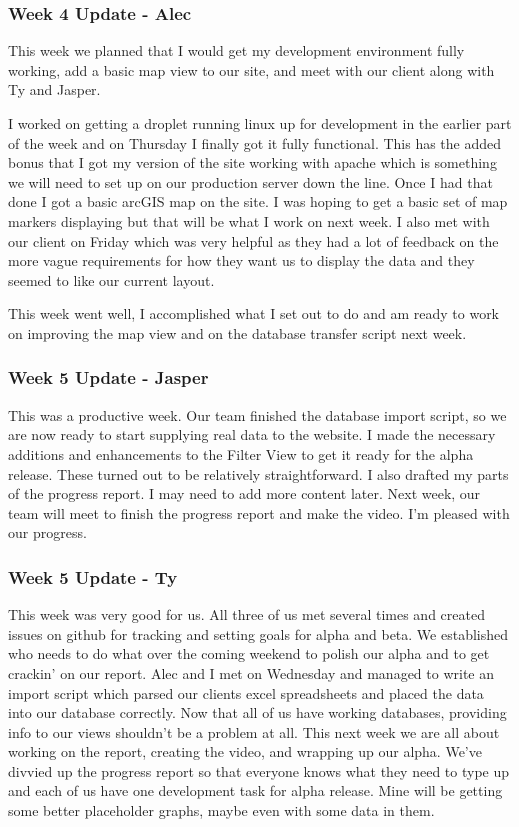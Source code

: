 \subsubsection{Week 4 Update - Alec}
​This week we planned that I would get my development environment fully working, add a basic map view to our site, and meet with our client along with Ty and Jasper.

I worked on getting a droplet running linux up for development in the earlier part of the week and on Thursday I finally got it fully functional.
This has the added bonus that I got my version of the site working with apache which is something we will need to set up on our production server down the line.
Once I had that done I got a basic arcGIS map on the site.
I was hoping to get a basic set of map markers displaying but that will be what I work on next week.
I also met with our client on Friday which was very helpful as they had a lot of feedback on the more vague requirements for how they want us to display the data and they seemed to like our current layout.

​This week went well, I accomplished what I set out to do and am ready to work on improving the map view and on the database transfer script next week.


\subsubsection{Week 5 Update - Jasper}
This was a productive week.
Our team finished the database import script, so we are now ready to start supplying real data to the website.
I made the necessary additions and enhancements to the Filter View to get it ready for the alpha release.
These turned out to be relatively straightforward.
I also drafted my parts of the progress report.
I may need to add more content later.
Next week, our team will meet to finish the progress report and make the video.​ I'm pleased with our progress.

\subsubsection{Week 5 Update - Ty}
This week was very good for us.
All three of us met several times and created issues on github for tracking and setting goals for alpha and beta.
We established who needs to do what over the coming weekend to polish our alpha and to get crackin' on our report.
Alec and I met on Wednesday and managed to write an import script which parsed our clients excel spreadsheets and placed the data into our database correctly.
Now that all of us have working databases, providing info to our views shouldn't be a problem at all.
This next week we are all about working on the report, creating the video, and wrapping up our alpha.
We've divvied up the progress report so that everyone knows what they need to type up and each of us have one development task for alpha release.
Mine will be getting some better placeholder graphs, maybe even with some data in them. ​

